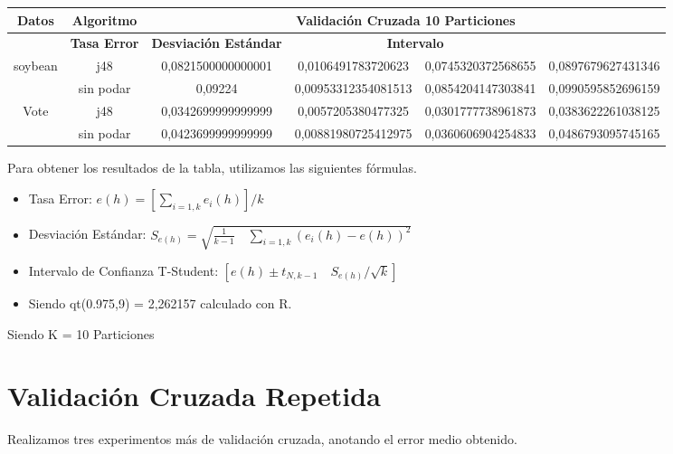 \documentclass{article}
\begin{document}
\begin{table}[h]
	\begin{adjustbox}{center}
		\begin{tabular}{|c|c|c|c|c|c|}
			\hline
			\rowcolor[gray]{0.8}
			\textbf{Datos} & \textbf{Algoritmo} & \multicolumn{4}{|c|}{\textbf{Validación Cruzada 10 Particiones}} \\ \hline
			\rowcolor[gray]{0.8}			
			\multicolumn{2}{|c|}{\textbf{ }} & \textbf{Tasa Error} & \textbf{Desviación Estándar} & 			\multicolumn{2}{|c|}{\textbf{Intervalo}} \\ \hline
			
			soybean & j48 & 0,0821500000000001 & 0,0106491783720623 & 0,0745320372568655 & 0,0897679627431346\\ \hline
			 & sin podar	 & 0,09224 & 0,00953312354081513 & 0,0854204147303841 & 0,0990595852696159\\ \hline
			Vote	 & j48 & 0,0342699999999999 & 0,0057205380477325 & 0,0301777738961873 & 0,0383622261038125\\ \hline
			 & sin podar	 & 0,0423699999999999 & 0,00881980725412975 & 0,0360606904254833 & 0,0486793095745165\\ \hline
		\end{tabular}
	\end{adjustbox}
\end{table}

Para obtener los resultados de la tabla, utilizamos las siguientes fórmulas.

\begin{itemize}
	\item Tasa Error: \hspace{0.5cm}	 $e(h) = [\sum_{i = 1,k}e_i(h)] / k $
	\item Desviación Estándar: \hspace{0.5cm}	$S_{e(h)} = \sqrt{\frac{1}{k-1} \quad \sum_{i=1,k}{(e_i(h)-e(h))^2}}$
	\item Intervalo de Confianza T-Student: \hspace{0.5cm}	$[e(h) \pm t_{N,k-1} \quad S_{e(h)}/\sqrt{k}]$
	\item Siendo \hspace{0.5cm} qt(0.975,9) = 2,262157 \hspace{0.5cm} calculado con R.
\end{itemize}
Siendo K = 10 Particiones

\vspace{1cm}


\section{Validación Cruzada Repetida}
Realizamos tres experimentos más de validación cruzada, anotando el error medio obtenido.
\end{document}
